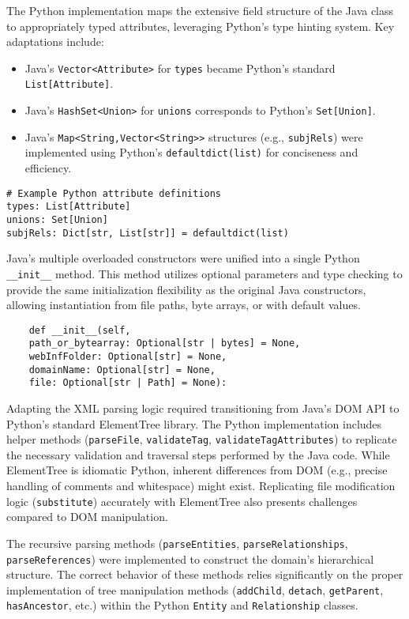 \documentclass[12pt,a4paper]{article}
\begin{document}
The Python implementation maps the extensive field structure of the Java class to appropriately typed attributes, leveraging Python's type hinting system. Key adaptations include:
\begin{itemize}
    \item Java's \texttt{Vector<Attribute>} for \texttt{types} became Python's standard \texttt{List[Attribute]}.
    \item Java's \texttt{HashSet<Union>} for \texttt{unions} corresponds to Python's \texttt{Set[Union]}.
    \item Java's \texttt{Map<String,Vector<String>>} structures (e.g., \texttt{subjRels}) were implemented using Python's \texttt{defaultdict(list)} for conciseness and efficiency.
\end{itemize}

\begin{verbatim}
# Example Python attribute definitions
types: List[Attribute]
unions: Set[Union]
subjRels: Dict[str, List[str]] = defaultdict(list)
\end{verbatim}

Java's multiple overloaded constructors were unified into a single Python \texttt{\_\_init\_\_} method. This method utilizes optional parameters and type checking to provide the same initialization flexibility as the original Java constructors, allowing instantiation from file paths, byte arrays, or with default values.

\begin{verbatim}
    def __init__(self,
    path_or_bytearray: Optional[str | bytes] = None,
    webInfFolder: Optional[str] = None,
    domainName: Optional[str] = None,
    file: Optional[str | Path] = None):
\end{verbatim}

Adapting the XML parsing logic required transitioning from Java's DOM API to Python's standard ElementTree library. The Python implementation includes helper methods (\texttt{parseFile}, \texttt{validateTag}, \texttt{validateTagAttributes}) to replicate the necessary validation and traversal steps performed by the Java code. While ElementTree is idiomatic Python, inherent differences from DOM (e.g., precise handling of comments and whitespace) might exist. Replicating file modification logic (\texttt{substitute}) accurately with ElementTree also presents challenges compared to DOM manipulation.

The recursive parsing methods (\texttt{parseEntities}, \texttt{parseRelationships}, \texttt{parseReferences}) were implemented to construct the domain's hierarchical structure. The correct behavior of these methods relies significantly on the proper implementation of tree manipulation methods (\texttt{addChild}, \texttt{detach}, \texttt{getParent}, \texttt{hasAncestor}, etc.) within the Python \texttt{Entity} and \texttt{Relationship} classes.
\end{document}
